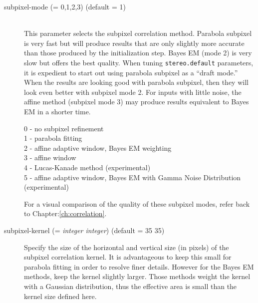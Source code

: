 \begin{description}

\item[subpixel-mode \textnormal{\small{(= 0,1,2,3)}} (default = 1)] \hfill \\
  This parameter selects the subpixel correlation method. Parabola subpixel
  is very fast but will produce results that are only slightly more accurate
   than those produced by the initialization step. Bayes EM (mode 2)
  is very slow but offers the best quality. When tuning {\tt stereo.default}
  parameters, it is expedient to start out using parabola subpixel as a
  ``draft mode.'' When the results are looking good with parabola subpixel,
  then they  will look even better with subpixel mode 2.  For inputs with
  little noise, the affine method (subpixel mode 3) may produce results
  equivalent to Bayes EM in a shorter time.

  \begin{description}
    \item[0 - no subpixel refinement]
    \item[1 - parabola fitting ]
    \item[2 - affine adaptive window, Bayes EM weighting ]
    \item[3 - affine window ]
    \item[4 - Lucas-Kanade method (experimental)]
    \item[5 - affine adaptive window, Bayes EM with Gamma Noise Distribution (experimental) ]
  \end{description}

  For a visual comparison of the quality of these subpixel modes,
  refer back to Chapter:\ref{ch:correlation}.

\item[subpixel-kernel \textnormal{\small{(= \emph{integer integer})}} (default = 35 35)]
  Specify the size of the horizontal and vertical size (in pixels) of
  the subpixel correlation kernel. It is advantageous to keep this
  small for parabola fitting in order to resolve finer
  details. However for the Bayes EM methods, keep the kernel slightly
  larger. Those methods weight the kernel with a Gaussian
  distribution, thus the effective area is small than the kernel size
  defined here.

\end{description}


